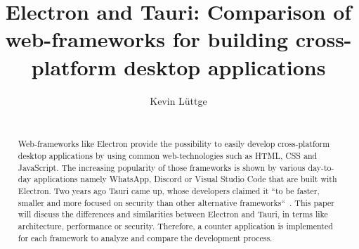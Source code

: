\documentclass{acm_proc_article-sp}
\date{\displaydate{date}}
\begin{document}
    \title{{\ttlit Electron} and {\ttlit Tauri}: Comparison of web-frameworks for building cross-platform desktop applications}
    \author{
        \alignauthor
        Kevin L\"uttge \\
        \\
    }

    \maketitle

    \begin{abstract}
        Web-frameworks like Electron provide the possibility to easily develop cross-platform desktop applications by using common web-technologies
        such as \ac{HTML}, \ac{CSS} and JavaScript.
        The increasing popularity of those frameworks is shown by various day-to-day applications namely WhatsApp, Discord or Visual Studio Code
        that are built with Electron.
        Two years ago Tauri came up, whose developers claimed it ``to be faster, smaller and more focused on security than other alternative frameworks``~\cite{tauri}.
        This paper will discuss the differences and similarities between Electron and Tauri, in terms like architecture, performance or security.
        Therefore, a counter application is implemented for each framework to analyze and compare the development process.
    \end{abstract}
    
    
    
    
    
    
    
    \newpage

    
    

    \balancecolumns
\end{document}
